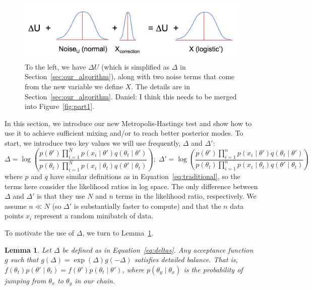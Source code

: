 \documentclass{article}
\newtheorem{lemma}{Lemma}
\begin{document}
\begin{figure}[t]
  \centering
  \includegraphics[width=\textwidth]{john_bair_fig02}
  \caption{
  To the left, we have $\Delta U$ (which is simplified as $\Delta$ in
  Section~\ref{sec:our_algorithm}), along with two noise terms that come from the new variable we
  define $X$. The details are in Section~\ref{sec:our_algorithm}.
  {\color{blue}
  Daniel: I think this needs to be merged into Figure~\ref{fig:part1}.
  }
  }
  \label{fig:part2}
\end{figure}

In this section, we introduce our new Metropolis-Hastings test and show how to use it to achieve
sufficient mixing and/or to reach better posterior modes. To start, we introduce two key values we
will use frequently, $\Delta$ and $\Delta'$:
\begin{equation}\label{eq:deltas}
\Delta = \log \left( \frac{p(\theta')  \prod_{i=1}^N p(x_i \mid \theta')  q(\theta_t \mid
\theta')}{p(\theta_t)\prod_{i=1}^N p(x_i \mid \theta_t)  q(\theta' \mid
\theta_t)} \right);\;  \Delta' = \log \left( \frac{p(\theta') \prod_{i=1}^n p(x_i \mid \theta') q(\theta_t \mid
\theta')}{p(\theta_t) \prod_{i=1}^n p(x_i \mid \theta_t) q(\theta' \mid
\theta_t)} \right)
\end{equation}
where $p$ and $q$ have similar definitions as in Equation~\ref{eq:traditional}, so the terms here
consider the likelihood ratios in log space. The only difference between $\Delta$ and $\Delta'$ is
that they use $N$ and $n$ terms in the likelihood ratio, respectively. We assume $n \ll N$ (so
$\Delta'$ is substantially faster to compute) and that the $n$ data points $x_i$ represent a random
minibatch of data.

To motivate the use of $\Delta$, we turn to Lemma~\ref{lem:detailed_balance}.

\begin{lemma}\label{lem:detailed_balance}
Let $\Delta$ be defined as in Equation~\ref{eq:deltas}. Any acceptance function $g$ such that
$g(\Delta) = \exp(\Delta) g(-\Delta )$ satisfies detailed balance. That is, $f(\theta_t)p(\theta'
\mid \theta_t) = f(\theta')p(\theta_t \mid \theta')$, where $p(\theta_y \mid \theta_x)$ is the
probability of jumping from $\theta_x$ to $\theta_y$ in our chain.
\end{lemma}
\end{document}
